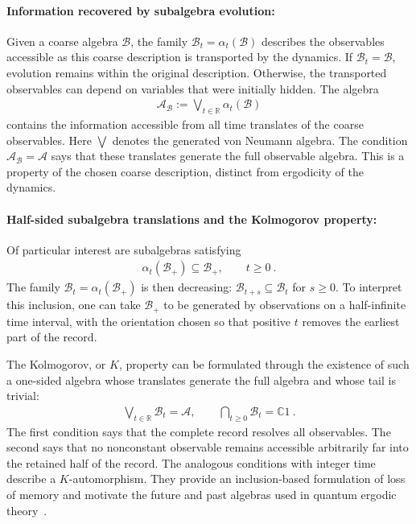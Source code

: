 \documentclass[a4paper,11pt]{article}
\theoremstyle{definition}
\newcommand{\mA}{\mathcal{A}}
\newcommand{\mB}{\mathcal{B}}
\begin{document}
\paragraph{Information recovered by subalgebra evolution:}
Given a coarse algebra $\mB$, the family $\mB_t=\alpha_t(\mB)$ describes the observables accessible as this coarse description is transported by the dynamics. If $\mB_t=\mB$, evolution remains within the original description. Otherwise, the transported observables can depend on variables that were initially hidden. The algebra
\begin{align}
    \mA_{\mB}:=\bigvee_{t\in\mathbb R}\alpha_t(\mB)
\end{align}
contains the information accessible from all time translates of the coarse observables. Here $\bigvee$ denotes the generated von Neumann algebra. The condition $\mA_{\mB}=\mA$ says that these translates generate the full observable algebra. This is a property of the chosen coarse description, distinct from ergodicity of the dynamics.






\paragraph{Half-sided subalgebra translations and the Kolmogorov property:}
Of particular interest are subalgebras satisfying
\begin{align}\label{eq:classical-one-sided-inclusion}
    \alpha_t(\mB_+)\subseteq\mB_+,\qquad t\geq0\ .
\end{align}
The family $\mB_t=\alpha_t(\mB_+)$ is then decreasing: $\mB_{t+s}\subseteq\mB_t$ for $s\geq0$. To interpret this inclusion, one can take $\mB_+$ to be generated by observations on a half-infinite time interval, with the orientation chosen so that positive $t$ removes the earliest part of the record.

The Kolmogorov, or $K$, property can be formulated through the existence of such a one-sided algebra whose translates generate the full algebra and whose tail is trivial:
\begin{align}\label{eq:classical-K-algebra}
    \bigvee_{t\in\mathbb R}\mB_t=\mA,
    \qquad
    \bigcap_{t\geq0}\mB_t=\mathbb C1\ .
\end{align}
The first condition says that the complete record resolves all observables. The second says that no nonconstant observable remains accessible arbitrarily far into the retained half of the record. The analogous conditions with integer time describe a $K$-automorphism. They provide an inclusion-based formulation of loss of memory and motivate the future and past algebras used in quantum ergodic theory~\cite{ouseph2024local}.
\end{document}
